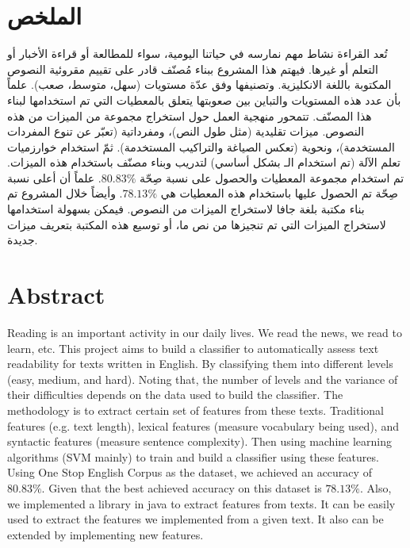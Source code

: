 

\section*{الملخص}
تُعد القراءة نشاط مهم نمارسه في حياتنا اليومية،
سواء للمطالعة أو قراءة الأخبار أو التعلم أو غيرها.
فيهتم هذا المشروع ببناء مُصنّف قادر على تقييم مقروئية النصوص المكتوبة باللغة الانكليزية.
وتصنيفها وفق عدّة مستويات (سهل، متوسط، صعب).
علماً بأن عدد هذه المستويات والتباين بين صعوبتها يتعلق بالمعطيات التي تم استخدامها لبناء هذا المصنّف.
تتمحور منهجية العمل حول استخراج مجموعة من الميزات من هذه النصوص.
ميزات تقليدية (مثل طول النص)، ومفرداتية (تعبّر عن تنوع المفردات المستخدمة)، ونحوية (تعكس الصياغة والتراكيب المستخدمة).
ثمّ استخدام خوارزميات تعلم الآلة (تم استخدام الـ  بشكل أساسي) لتدريب وبناء مصنّف باستخدام هذه الميزات.
تم استخدام مجموعة المعطيات  والحصول على نسبة صِحّة $80.83\%$.
علماً أن أعلى نسبة صِحّة تم الحصول عليها باستخدام هذه المعطيات هي $78.13\%$.
وأيضاً خلال المشروع تم بناء مكتبة بلغة جافا لاستخراج الميزات من النصوص.
فيمكن بسهولة استخدامها لاستخراج الميزات التي تم تنجيزها من نص ما، أو توسيع هذه المكتبة بتعريف ميزات جديدة.


\vfill
{}
\section*{Abstract}

Reading is an important activity in our daily lives.
We read the news, we read to learn, etc.
This project aims to build a classifier to automatically assess text readability for texts written in English.
By classifying them into different levels (easy, medium, and hard).
Noting that, the number of levels and the variance of their difficulties depends on the data used to build the classifier.
The methodology is to extract certain set of features from these texts.
Traditional features (e.g. text length), lexical features (measure vocabulary being used),
and syntactic features (measure sentence complexity).
Then using machine learning algorithms (SVM mainly) to train and build a classifier using these features.
Using One Stop English Corpus as the dataset, we achieved an accuracy of $80.83\%$.
Given that the best achieved accuracy on this dataset is $78.13\%$.
Also, we implemented a library in java to extract features from texts.
It can be easily used to extract the features we implemented from a given text.
It also can be extended by implementing new features.






